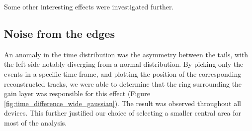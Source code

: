 Some other interesting effects were investigated further.



\subsection{Noise from the edges}\label{sec:deviations_from_gaussian}

An anomaly in the time distribution was the asymmetry between the tails, with the left side notably diverging from a normal distribution. By picking only the events in a specific time frame, and plotting the position of the corresponding reconstructed tracks, we were able to determine that the ring surrounding the gain layer was responsible for this effect (Figure \ref{fig:time_difference_wide_gaussian}). The result was observed throughout all devices. This further justified our choice of selecting a smaller central area for most of the analysis.

